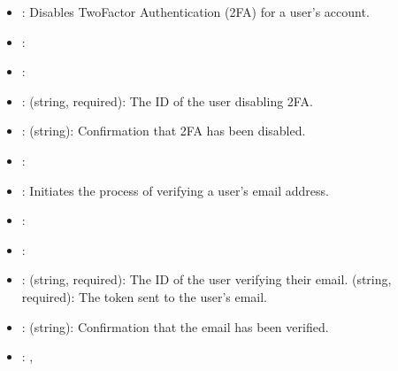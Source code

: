 \documentclass[letterpaper,10pt,english]{sphinxmanual}
\begin{document}
\sphinxAtStartPar
{}
\begin{itemize}
\item {} 
\sphinxAtStartPar
{}: Disables Two\sphinxhyphen{}Factor Authentication (2FA) for a user’s account.

\item {} 
\sphinxAtStartPar
{}: 

\item {} 
\sphinxAtStartPar
{}: 

\item {} 
\sphinxAtStartPar
{}:
\sphinxhyphen{}  (string, required): The ID of the user disabling 2FA.

\item {} 
\sphinxAtStartPar
{}:
\sphinxhyphen{}  (string): Confirmation that 2FA has been disabled.

\item {} 
\sphinxAtStartPar
{}: 

\end{itemize}

\sphinxAtStartPar
{}
\begin{itemize}
\item {} 
\sphinxAtStartPar
{}: Initiates the process of verifying a user’s email address.

\item {} 
\sphinxAtStartPar
{}: 

\item {} 
\sphinxAtStartPar
{}: 

\item {} 
\sphinxAtStartPar
{}:
\sphinxhyphen{}  (string, required): The ID of the user verifying their email.
\sphinxhyphen{}  (string, required): The token sent to the user’s email.

\item {} 
\sphinxAtStartPar
{}:
\sphinxhyphen{}  (string): Confirmation that the email has been verified.

\item {} 
\sphinxAtStartPar
{}: , 

\end{itemize}
\end{document}
